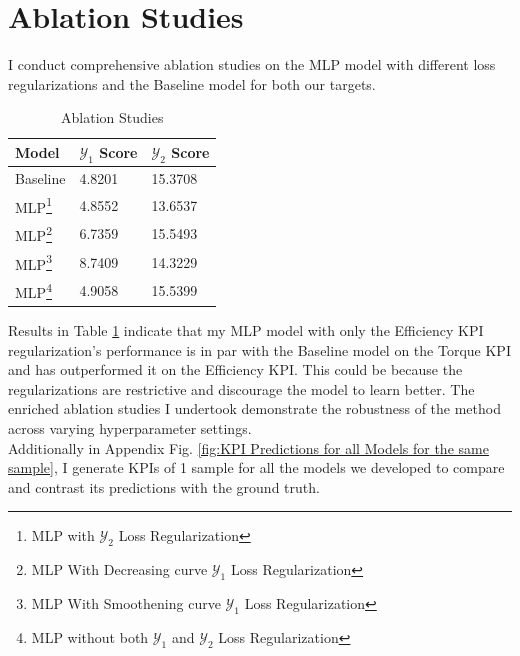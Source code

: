 \documentclass{report} %
\begin{document}
\section{Ablation Studies}\label{sec:Ablation Studies}

I conduct comprehensive ablation studies on the \ac{MLP} model with different loss regularizations and the Baseline model for both our targets.

\begin{minipage}[t]{\textwidth}
    \begin{table}[H]
        \centering
        \begin{tabular}{|p{}|p{}|p{}|}
        \hline {\bf Model} & {\bf $\mathcal{Y}_1$ Score} & {\bf $\mathcal{Y}_2$ Score}\\
        \hline 
        Baseline & 4.8201 & 15.3708 \\
        MLP\footnote{MLP with $\mathcal{Y}_2$ Loss Regularization} & 4.8552 & 13.6537  \\
        MLP\footnote{MLP With Decreasing curve $\mathcal{Y}_1$ Loss Regularization} & 6.7359 & 15.5493 \\
        MLP\footnote{MLP With Smoothening curve $\mathcal{Y}_1$ Loss Regularization} & 8.7409 & 14.3229 \\
        MLP\footnote{MLP without both $\mathcal{Y}_1$ and $\mathcal{Y}_2$ Loss Regularization} &  4.9058 & 15.5399  \\
        \hline
        \end{tabular}
        \caption{Ablation Studies}
        \label{tab:Ablation Studies}
    \end{table}
\end{minipage}

\vspace{1em} 

Results in Table \ref{tab:Ablation Studies} indicate that my \ac{MLP} model with only the Efficiency \ac{KPI} regularization's performance is in par with the 
Baseline model on the Torque \ac{KPI} and has outperformed it on the Efficiency \ac{KPI}. This could be because the regularizations are restrictive and discourage 
the model to learn better.
The enriched ablation studies I undertook demonstrate the robustness of the method across varying hyperparameter settings.\\

Additionally in Appendix Fig. \ref{fig:KPI Predictions for all Models for the same sample}, I generate \ac{KPI}s of 1 sample for all the models we developed to 
compare and contrast its predictions with the ground truth.\\
\end{document}
